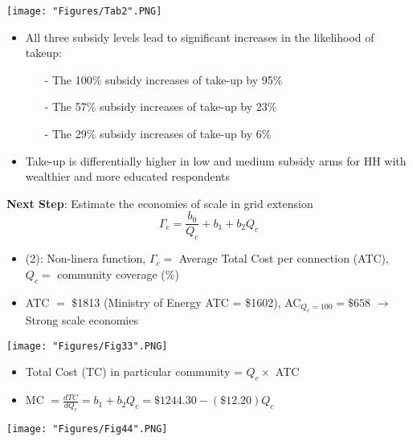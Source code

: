 \documentclass[compress]{beamer}
\begin{document}
\begin{frame}
\begin{adjustbox}{center}
\texttt{[image: "Figures/Tab2".PNG]} 
\end{adjustbox}
\end{frame}


\begin{frame}
\begin{itemize}
\item All three subsidy levels lead to significant increases in the likelihood of takeup: \vspace{2mm}
\begin{itemize} \footnotesize \setlength{\itemsep}{0.5em}
\item[-] The 100\% subsidy increases of take-up by 95\%
\item[-] The 57\% subsidy increases of take-up by 23\%
\item[-] The 29\% subsidy increases of take-up by 6\%
\end{itemize}
\item Take-up is differentially higher in low and medium subsidy arms for HH with wealthier and more educated respondents
\end{itemize}
\textbf{Next Step}: Estimate the economies of scale in grid extension
\begin{equation}
\Gamma_c=\frac{b_0}{Q_c}+b_1+b_2Q_c
\end{equation}
\begin{itemize}
\item (2): Non-linera function, $\Gamma_c=$ Average Total Cost per connection (ATC), $Q_c=$ community coverage (\%)
\item ATC $=$ \$1813 (Ministry of Energy ATC = \$1602), AC$_{Q_c=100} = \$658$ $\to$ Strong scale economies
\end{itemize}
\end{frame}

\begin{frame} \centering
\texttt{[image: "Figures/Fig33".PNG]} 
\end{frame}


\begin{frame} \centering
\begin{itemize}
\item Total Cost (TC) in particular community = $Q_c\times$ ATC
\item MC $=\frac{dTC}{dQ_c}=b_1+b_2Q_c=\$1244.30 - (\$12.20)Q_c$ 
\end{itemize}
\texttt{[image: "Figures/Fig44".PNG]} 
\end{frame}
\end{document}
